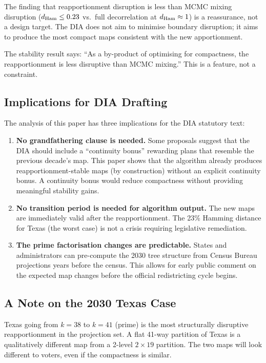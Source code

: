 The finding that reapportionment disruption is less than MCMC mixing
disruption ($d_{\rm Ham} \leq 0.23$ vs.\ full decorrelation at
$d_{\rm Ham} \approx 1$) is a reassurance, not a design target.
The DIA does not aim to minimise boundary disruption; it aims to produce
the most compact maps consistent with the new apportionment.

The stability result says: ``As a by-product of optimising for compactness,
the \ar{} reapportionment is less disruptive than MCMC mixing.''
This is a feature, not a constraint.

\subsection{Implications for DIA Drafting}

The analysis of this paper has three implications for the DIA statutory text:

\begin{enumerate}
\item \textbf{No grandfathering clause is needed.}
      Some proposals suggest that the DIA should include a ``continuity
      bonus'' rewarding plans that resemble the previous decade's map.
      This paper shows that the \ar{} algorithm already produces
      reapportionment-stable maps (by construction) without an explicit
      continuity bonus.
      A continuity bonus would reduce compactness without providing
      meaningful stability gains.

\item \textbf{No transition period is needed for algorithm output.}
      The new maps are immediately valid after the reapportionment.
      The 23\% Hamming distance for Texas (the worst case) is not a
      crisis requiring legislative remediation.

\item \textbf{The prime factorisation changes are predictable.}
      States and administrators can pre-compute the 2030 tree structure
      from Census Bureau projections years before the census.
      This allows for early public comment on the expected map changes
      before the official redistricting cycle begins.
\end{enumerate}

\subsection{A Note on the 2030 Texas Case}

Texas going from $k = 38$ to $k = 41$ (prime) is the most structurally
disruptive reapportionment in the projection set.
A flat 41-way partition of Texas is a qualitatively different map from
a 2-level $2 \times 19$ partition.
The two maps will look different to voters, even if the compactness is
similar.

